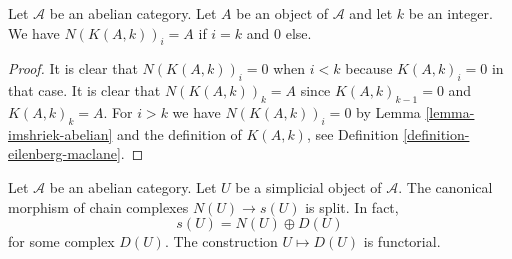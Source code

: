 \begin{lemma}
\label{lemma-N-K}
Let $\mathcal{A}$ be an abelian category.
Let $A$ be an object of $\mathcal{A}$ and
let $k$ be an integer. We have
$N(K(A, k))_i = A$ if $i = k$ and
$0$ else.
\end{lemma}

\begin{proof}
It is clear that $N(K(A, k))_i = 0$ when $i < k$
because $K(A, k)_i = 0$ in that case.
It is clear that $N(K(A, k))_k = A$ since
$K(A, k)_{k - 1} = 0$ and $K(A, k)_k = A$.
For $i > k$ we have $N(K(A, k))_i = 0$
by Lemma \ref{lemma-imshriek-abelian} and
the definition of $K(A, k)$, see Definition
\ref{definition-eilenberg-maclane}.
\end{proof}

\begin{lemma}
\label{lemma-decompose-associated-complexes}
Let $\mathcal{A}$ be an abelian category.
Let $U$ be a simplicial object of $\mathcal{A}$.
The canonical morphism of chain complexes
$N(U) \to s(U)$ is split. In fact,
$$
s(U) = N(U) \oplus D(U)
$$
for some complex $D(U)$. The construction $U \mapsto D(U)$
is functorial.
\end{lemma}

